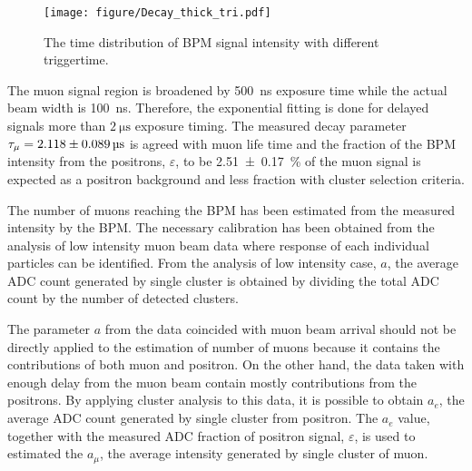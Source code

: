 \documentclass[preprint,3p,twocolumn]{elsarticle}
\begin{document}
\begin{figure}[tb]
	\begin{minipage}[t]{60mm}
		\texttt{[image: figure/Decay\_thick\_tri.pdf]}
	\end{minipage}
	\caption{The time distribution of BPM signal intensity with different triggertime.}
	\label{fig:time_distribution}
	\vspace{-0.2cm}
\end{figure}
The muon signal region is broadened by \SI{500}{\nano\s} exposure time while the actual beam width is \SI{100}{\nano\s}. Therefore, the exponential fitting is done for delayed signals more than $\SI{2}{\micro\s}$ exposure timing. The measured decay parameter $\tau_{\mu}=\SI{2.118 \pm 0.089}{\micro\s}$ is agreed with muon life time and the fraction of the BPM intensity from the positrons, $\varepsilon$, to be \SI{2.51 \pm 0.17}{\percent} of the muon signal is expected as a positron background and less fraction with cluster selection criteria. 

The number of muons reaching the BPM has been estimated from the measured intensity by the BPM. The necessary calibration has been obtained from the analysis of low intensity muon beam data where response of each individual particles can be identified. From the analysis of low intensity case, $a$, the average ADC count generated by single cluster is obtained by dividing the total ADC count by the number of detected clusters.

The parameter $a$ from the data coincided with muon beam arrival should not be directly applied to the estimation of number of muons because it contains the contributions of both muon and positron. On the other hand, the data taken with enough delay from the muon beam contain mostly contributions from the positrons. By applying cluster analysis to this data, it is possible to obtain $a_e$, the average ADC count generated by single cluster from positron. The $a_e$ value, together with the measured ADC fraction of positron signal, $\varepsilon$, is used to estimated the $a_\mu$, the average intensity generated by single cluster of muon.
\end{document}
